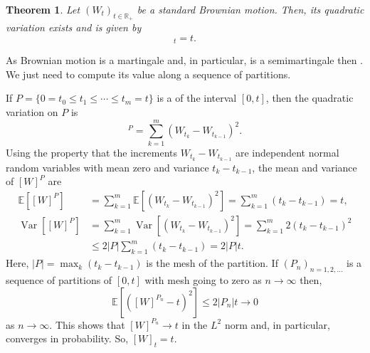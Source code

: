 \documentclass[12pt]{article}
\newtheorem*{theorem*}{Theorem}
\begin{document}

\begin{theorem*}
Let $(W_t)_{t\in\mathbb{R}_+}$ be a standard Brownian motion. Then, its quadratic variation exists and is given by
\begin{equation*}
[W]_t=t.
\end{equation*}
\end{theorem*}

As Brownian motion is a martingale and, in particular, is a semimartingale then . We just need to compute its value along a sequence of partitions.

If $P=\{0=t_0\le t_1\le\cdots\le t_m=t\}$ is a  of the interval $[0,t]$, then the quadratic variation on $P$ is
\begin{equation*}
[W]^P=\sum_{k=1}^m(W_{t_k}-W_{t_{k-1}})^2.
\end{equation*}
Using the property that the increments $W_{t_k}-W_{t_{k-1}}$ are independent normal random variables with mean zero and variance $t_k-t_{k-1}$, the mean and variance of $[W]^P$ are
\begin{align*}
\mathbb{E}\left[[W]^P\right]&=\sum_{k=1}^m\mathbb{E}\left[(W_{t_k}-W_{t_{k-1}})^2\right]=\sum_{k=1}^m(t_k-t_{k-1})=t,\\
\operatorname{Var}\left[[W]^P\right]&=\sum_{k=1}^m\operatorname{Var}\left[(W_{t_k}-W_{t_{k-1}})^2\right]=\sum_{k=1}^m2(t_k-t_{k-1})^2\\
&\le 2|P|\sum_{k=1}^m(t_k-t_{k-1})=2|P|t.
\end{align*}
Here, $|P|=\max_k(t_k-t_{k-1})$ is the mesh of the partition.
If $(P_n)_{n=1,2,\ldots}$ is a sequence of partitions of $[0,t]$ with mesh going to zero as $n\rightarrow \infty$ then,
\begin{equation*}
\mathbb{E}\left[([W]^{P_n}-t)^2\right]\le 2|P_n|t\rightarrow 0
\end{equation*}
as $n\rightarrow\infty$. This shows that $[W]^{P_n}\rightarrow t$ in the $L^2$ norm and, in particular, converges in probability. So, $[W]_t=t$.

\end{document}
